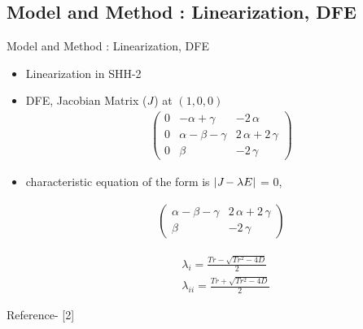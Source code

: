 \documentclass[smaller,aspectratio=169, toc=bibliography]{beamer}
\begin{document}
\subsection*{Model and Method : Linearization, DFE}
\begin{frame}[fragile]{Model and Method : Linearization, DFE}
\begin{itemize}
\item Linearization in SHH-2
\item DFE, Jacobian Matrix ($\emph{J}$) at $(1, 0, 0)$
\begin{equation*}
\label{jacobian at equilibrium point}
\begin{aligned}
		\left(\begin{array}{rrr}
		0 & -\alpha + \gamma & -2 \, \alpha \\
		0 & \alpha - \beta - \gamma & 2 \, \alpha + 2 \, \gamma \\
		0 & \beta & -2 \, \gamma
		\end{array}\right)
\end{aligned}
\end{equation*}

\item characteristic equation of the form is \( | \emph{J} - \lambda E | \) = 0,

\begin{equation*}
\label{submatrix}
\begin{aligned}
	\left(\begin{array}{rr}
		\alpha - \beta - \gamma & 2 \, \alpha + 2 \, \gamma \\
		\beta & -2 \, \gamma
		\end{array}\right)
\end{aligned}
\end{equation*}

\begin{equation*}
\label{eigenvalue} 
\begin{aligned}
&\lambda_{i} = \frac{Tr - \sqrt{Tr^2-4D}}{2}\\
&\lambda_{ii} = \frac{Tr + \sqrt{Tr^2-4D}}{2}    
\end{aligned}
\end{equation*}
\end{itemize}
\tiny{Reference- [2]}
\end{frame}
\end{document}

